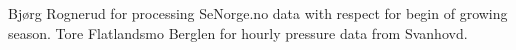 \documentclass[bg, manuscript]{copernicus}
\begin{document}


\begin{acknowledgements}
  Bj{\o}rg Rognerud for processing SeNorge.no data with respect for begin of growing season.
  Tore Flatlandsmo Berglen for hourly pressure data from Svanhovd.
\end{acknowledgements}

















\end{document}
